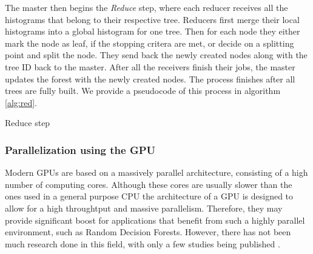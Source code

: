 \documentclass[thesis=B,english]{FITthesis}[2012/10/20]
\begin{document}
	The master then begins the \emph{Reduce} step, where each reducer receives all the histograms that belong to their respective tree. Reducers first merge their local histograms into a global histogram for one tree. Then for each node they either mark the node as leaf, if the stopping critera are met, or decide on a splitting point and split the node. They send back the newly created nodes along with the tree ID back to the master. After all the receivers finish their jobs, the master updates the forest with the newly created nodes. The process finishes after all trees are fully built. We provide a pseudocode of this process in algorithm \ref{alg:red}.

	\begin{algorithm}[H]
	\caption{Reduce step}
	\label{alg:red}

	\end{algorithm} 

	\subsubsection{Parallelization using the GPU}
	Modern GPUs are based on a massively parallel architecture, consisting of a high number of computing cores. Although these cores are usually slower than the ones used in a general purpose CPU the architecture of a GPU is designed to allow for a high throughtput and massive parallelism. Therefore, they may provide significant boost for applications that benefit from such a highly parallel environment, such as Random Decision Forests. However, there has not been much research done in this field, with only a few studies being published \cite{sharp2008implementing,grahn2011cudarf, liao2013learning}.
	
\end{document}
